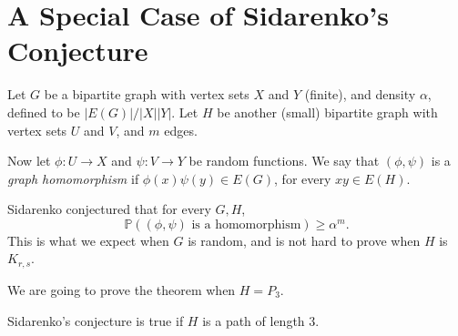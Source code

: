 \documentclass[12pt]{article}
\begin{document}
\newpage

\section{A Special Case of Sidarenko's Conjecture}%
\label{sec:scsc}

Let $G$ be a bipartite graph with vertex sets $X$ and $Y$ (finite), and density $\alpha$, defined to be $|E(G)|/|X||Y|$. Let $H$ be another (small) bipartite graph with vertex sets $U$ and $V$, and $m$ edges.

Now let $\phi : U \to X$ and $\psi : V \to Y$ be random functions. We say that $(\phi, \psi)$ is a \emph{graph homomorphism} if $\phi(x) \psi(y) \in E(G)$, for every $xy \in E(H)$.

Sidarenko conjectured that for every $G, H$,
\[
	\mathbb{P}((\phi, \psi) \text{ is a homomorphism}) \geq \alpha^{m}.
\]
This is what we expect when $G$ is random, and is not hard to prove when $H$ is $K_{r,s}$.

We are going to prove the theorem when $H = P_3$.

\begin{theorem}
	Sidarenko's conjecture is true if $H$ is a path of length $3$.
\end{theorem}
\end{document}

